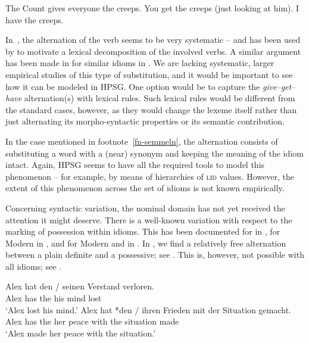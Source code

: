 \documentclass[output=paper
 	        ,biblatex
                ,babelshorthands
                ,newtxmath
                ,draftmode
                ,colorlinks, citecolor=brown
]{langscibook}
\begin{document}
\eal  \label{creeps}
\ex The Count gives everyone the creeps.
\ex You get the creeps (just looking at him).
\ex I have the creeps.
\zl 

\noindent
In~, the alternation of the verb seems to be very systematic -- and has been used by
\citet{Richards:01} to motivate a lexical decomposition of the involved verbs.  A similar argument has been
made in \citet{Mateu:Espinal:07} for similar idioms in .  We are lacking systematic,
larger empirical studies of this type of substitution, and it would be important to see how it can
be modeled in HPSG.  One option would be to capture the \emph{give}--\emph{get}--\emph{have}
alternation(s) with lexical rules. Such lexical rules would be different from the standard cases,
however, as they would change the lexeme itself rather than just alternating its morpho-syntactic
properties or its semantic contribution.

In the case mentioned in footnote~\ref{fn-semmeln}, the alternation consists of substituting a word
with a (near) synonym and keeping the meaning of the idiom intact. Again, HPSG seems to have all the
required tools to model this phenomenon -- for example, by means of hierarchies of
\textsc{lid} values.  However, the extent of this phenomenon across the set of idioms is not
known empirically.

Concerning syntactic variation, the nominal domain has not yet received the attention it might
deserve.  There is a well-known variation with respect to the marking of possession within idioms.
This has been documented for  in \citet{Ho:15}, for Modern
 in \citet{Almog:12}, and for Modern  and 
in \citet{Markantonatou:Sailer:16}.  In , we find a relatively free alternation between
a plain definite and a possessive; see . This is, however, not possible with all
idioms; see .

\eal \label{ex-verstand-herz}
\ex 
\gll Alex hat den / seinen Verstand verloren.\\
Alex has the {} his mind lost\\
\glt `Alex lost his mind.'\label{ex-verstand}
\ex 
\gll Alex hat *den / ihren Frieden mit der Situation gemacht.\\
     Alex has \hphantom{*}the {} her peace with the situation made\\
\glt `Alex made her peace with the situation.'\label{ex-frieden}
\zl 
\end{document}
